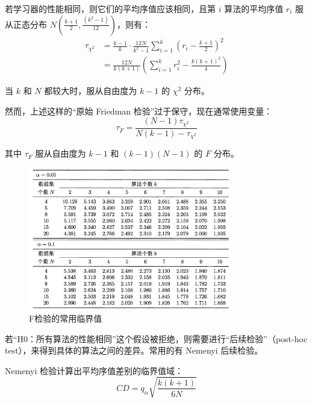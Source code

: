 \documentclass[12pt, a4paper]{article} %
\begin{document}
若学习器的性能相同，则它们的平均序值应该相同，且第 $i$ 算法的平均序值 $r_i$ 服从正态分布 $\displaystyle N(\frac{k + 1}{2}, \frac{(k^2 - 1)}{12})$，则有：
\begin{equation*}
    \begin{array}{*{20}{l}}
        {{\tau _{{\chi ^2}}}}&{ = \displaystyle \frac{{k - 1}}{k} \cdot \frac{{12N}}{{{k^2} - 1}}\sum\limits_{i = 1}^k {{{\left({r_i} - \frac{{k + 1}}{2}\right)}^2}} }\\
        {}&{ =  \displaystyle \frac{{12N}}{{k(k + 1)}}\left( {\sum\limits_{i = 1}^k {r_i^2}  - \frac{{k{{(k + 1)}^2}}}{4}} \right)}
    \end{array}
\end{equation*}

当 $k$ 和 $N$ 都较大时，服从自由度为 $k - 1$ 的 $\chi^2$ 分布。

然而，上述这样的“原始 Friedman 检验”过于保守，现在通常使用变量：
\begin{equation*}
    \tau_F = \frac{(N - 1) \tau_{\chi^2}}{N(k - 1) - \tau_{\chi^2}}
\end{equation*}

其中 $\tau_{F}$ 服从自由度为 $k - 1$ 和 $(k - 1)(N - 1)$ 的 $F$ 分布。

\begin{figure}[H]
    \centering
    \includegraphics[width=0.8\textwidth]{../img/2-12-F检验的常用临界值.png}
    \caption{F检验的常用临界值}
    \label{fig:F检验的常用临界值}
\end{figure}

若“H0：所有算法的性能相同”这个假设被拒绝，则需要进行“后续检验”（post-hoc test），来得到具体的算法之间的差异。常用的有 Nemenyi 后续检验。

Nemenyi 检验计算出平均序值差别的临界值域：
\begin{equation*}
    CD = q_{\alpha} \sqrt{\frac{k(k + 1)}{6N}}
\end{equation*}
\end{document}
